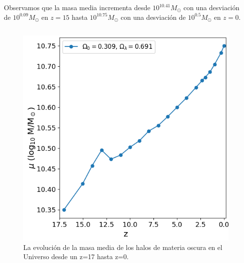 \documentclass{beamer}
\begin{document}
	\begin{frame}
			\small Observamos que la masa media incrementa desde $10^{10.41}M_\odot$ con una desviación de $10^{0.09}M_\odot$ en $z=15$ hasta $10^{10.75}M_\odot$ con una desviación de $10^{0.5}M_\odot$ en $z=0$.
		\begin{columns}[t]
			\begin{column}{.5\textwidth}
				\begin{figure}
					\centering
					\includegraphics[scale=0.3]{RunCanonica/MassMean_RunCanonica.png}
					\caption{\footnotesize La evolución de la masa media de los halos de materia oscura en el Universo desde un z=17 hasta z=0.}
					\label{fig:Canon-MassMean}
				\end{figure}
			\end{column}
			

\end{columns}
\end{frame}
\end{document}
